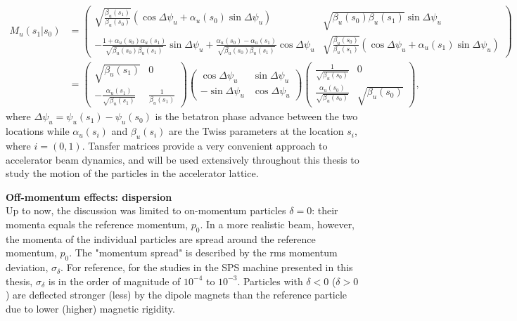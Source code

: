 \begin{equation}\label{eq:linear_transfer_matrix}
    \begin{split}
    M_u (s_1 |  s_0) &= \begin{pmatrix}
        \sqrt{\frac{\beta_u(s_1)}{\beta_u(s_0)}} (\cos{\Delta \psi_u}+\alpha_u (s_0) \sin{\Delta \psi_u}) & \sqrt{\beta_u(s_0)\beta_u(s_1)}\sin{\Delta \psi_u} \\ 
         - \frac{1+\alpha_u(s_0) \alpha_u(s_1)}{\sqrt{\beta_u(s_0) \beta_u(s_1)}} \sin{\Delta \psi_u}+ \frac{\alpha_u(s_0) - \alpha_u(s_1)}{\sqrt{\beta_u(s_0) \beta_u(s_1)}} \cos{\Delta \psi_u} & \sqrt{\frac{\beta_u(s_0)}{\beta_u(s_1)}} (\cos{\Delta \psi_u}+\alpha_u(s_1) \sin{\Delta \psi_u})
        \end{pmatrix} \\ 
        &=\begin{pmatrix}
            \sqrt{\beta_u(s_1)} & 0 \\
            -\frac{\alpha_u(s_1)}{\sqrt{\beta_u(s_1)}}& \frac{1}{\beta_u(s_1)}
            \end{pmatrix} \begin{pmatrix}
            \cos{\Delta \psi_u} & \sin{\Delta \psi_u} \\
            -\sin{\Delta \psi_u}& \cos{\Delta \psi_u}
            \end{pmatrix} \begin{pmatrix}
            \frac{1}{\sqrt{\beta_u(s_0)}} & 0 \\
            \frac{\alpha_u(s_0)}{\sqrt{\beta_u(s_0)}} & \sqrt{\beta_u(s_0)}
            \end{pmatrix},
    \end{split}
\end{equation}
where $\Delta \psi_u = \psi_u(s_1)-\psi_u(s_0)$ is the betatron phase advance between the two locations while $\alpha_u(s_i)$ and $\beta_u(s_i)$ are the Twiss parameters at the location $s_i$, where $i=(0,1)$. Tansfer matrices provide a very convenient approach to accelerator beam dynamics, and will be used extensively throughout this thesis to study the motion of the particles in the accelerator lattice.

\textbf{Off-momentum effects: dispersion}\\
Up to now, the discussion was limited to on-momentum particles $\delta=0$: their momenta equals the reference momentum, $p_0$. In a more realistic beam, however, the momenta of the individual particles are spread around the reference momentum, $p_0$. The "momentum spread" is described by the rms momentum deviation, $\sigma_\delta$. For reference, for the studies in the SPS machine presented in this thesis, $\sigma_\delta$ is in the order of magnitude of $10^{-4}$ to $10^{-3}$. Particles with $\delta < 0$ ($\delta>0$) are deflected stronger (less) by the dipole magnets than the reference particle due to lower (higher) magnetic rigidity.

